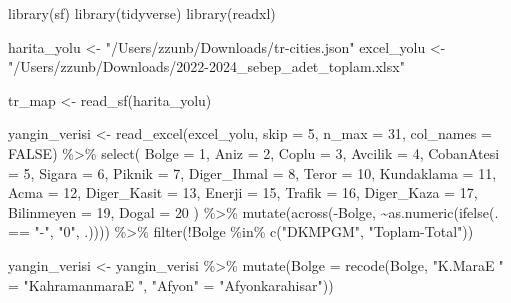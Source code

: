\documentclass[
  11pt,
  a4paper,
  DIV=11,
  numbers=noendperiod]{scrartcl}
\newenvironment{Shaded}{\begin{snugshade}}{\end{snugshade}}
\newcommand{\AttributeTok}[1]{\textcolor[rgb]{0.40,0.45,0.13}{#1}}
\newcommand{\ConstantTok}[1]{\textcolor[rgb]{0.56,0.35,0.01}{#1}}
\newcommand{\DecValTok}[1]{\textcolor[rgb]{0.68,0.00,0.00}{#1}}
\newcommand{\FunctionTok}[1]{\textcolor[rgb]{0.28,0.35,0.67}{#1}}
\newcommand{\NormalTok}[1]{\textcolor[rgb]{0.00,0.23,0.31}{#1}}
\newcommand{\OtherTok}[1]{\textcolor[rgb]{0.00,0.23,0.31}{#1}}
\newcommand{\SpecialCharTok}[1]{\textcolor[rgb]{0.37,0.37,0.37}{#1}}
\newcommand{\StringTok}[1]{\textcolor[rgb]{0.13,0.47,0.30}{#1}}
\begin{document}
\begin{Shaded}
\begin{Highlighting}[]
\FunctionTok{library}\NormalTok{(sf)}
\FunctionTok{library}\NormalTok{(tidyverse)}
\FunctionTok{library}\NormalTok{(readxl)}

\NormalTok{harita\_yolu }\OtherTok{\textless{}{-}} \StringTok{"/Users/zzunb/Downloads/tr{-}cities.json"}
\NormalTok{excel\_yolu }\OtherTok{\textless{}{-}} \StringTok{"/Users/zzunb/Downloads/2022{-}2024\_sebep\_adet\_toplam.xlsx"}

\NormalTok{tr\_map }\OtherTok{\textless{}{-}} \FunctionTok{read\_sf}\NormalTok{(harita\_yolu)}

\NormalTok{yangin\_verisi }\OtherTok{\textless{}{-}} \FunctionTok{read\_excel}\NormalTok{(excel\_yolu, }\AttributeTok{skip =} \DecValTok{5}\NormalTok{, }\AttributeTok{n\_max =} \DecValTok{31}\NormalTok{, }\AttributeTok{col\_names =} \ConstantTok{FALSE}\NormalTok{) }\SpecialCharTok{\%\textgreater{}\%}
  \FunctionTok{select}\NormalTok{(}
    \AttributeTok{Bolge =} \DecValTok{1}\NormalTok{,}
    \AttributeTok{Aniz =} \DecValTok{2}\NormalTok{, }\AttributeTok{Coplu =} \DecValTok{3}\NormalTok{, }\AttributeTok{Avcilik =} \DecValTok{4}\NormalTok{, }\AttributeTok{CobanAtesi =} \DecValTok{5}\NormalTok{, }\AttributeTok{Sigara =} \DecValTok{6}\NormalTok{, }\AttributeTok{Piknik =} \DecValTok{7}\NormalTok{, }\AttributeTok{Diger\_Ihmal =} \DecValTok{8}\NormalTok{,}
    \AttributeTok{Teror =} \DecValTok{10}\NormalTok{, }\AttributeTok{Kundaklama =} \DecValTok{11}\NormalTok{, }\AttributeTok{Acma =} \DecValTok{12}\NormalTok{, }\AttributeTok{Diger\_Kasit =} \DecValTok{13}\NormalTok{,}
    \AttributeTok{Enerji =} \DecValTok{15}\NormalTok{, }\AttributeTok{Trafik =} \DecValTok{16}\NormalTok{, }\AttributeTok{Diger\_Kaza =} \DecValTok{17}\NormalTok{,}
    \AttributeTok{Bilinmeyen =} \DecValTok{19}\NormalTok{, }\AttributeTok{Dogal =} \DecValTok{20}
\NormalTok{  ) }\SpecialCharTok{\%\textgreater{}\%}
  \FunctionTok{mutate}\NormalTok{(}\FunctionTok{across}\NormalTok{(}\SpecialCharTok{{-}}\NormalTok{Bolge, }\SpecialCharTok{\textasciitilde{}}\FunctionTok{as.numeric}\NormalTok{(}\FunctionTok{ifelse}\NormalTok{(. }\SpecialCharTok{==} \StringTok{"{-}"}\NormalTok{, }\StringTok{"0"}\NormalTok{, .)))) }\SpecialCharTok{\%\textgreater{}\%}
  \FunctionTok{filter}\NormalTok{(}\SpecialCharTok{!}\NormalTok{Bolge }\SpecialCharTok{\%in\%} \FunctionTok{c}\NormalTok{(}\StringTok{"DKMPGM"}\NormalTok{, }\StringTok{"Toplam{-}Total"}\NormalTok{))}

\NormalTok{yangin\_verisi }\OtherTok{\textless{}{-}}\NormalTok{ yangin\_verisi }\SpecialCharTok{\%\textgreater{}\%}
  \FunctionTok{mutate}\NormalTok{(}\AttributeTok{Bolge =} \FunctionTok{recode}\NormalTok{(Bolge, }
                        \StringTok{"K.MaraE"} \OtherTok{=} \StringTok{"KahramanmaraE"}\NormalTok{,}
                        \StringTok{"Afyon"} \OtherTok{=} \StringTok{"Afyonkarahisar"}\NormalTok{))}
\end{Highlighting}
\end{Shaded}
\end{document}
